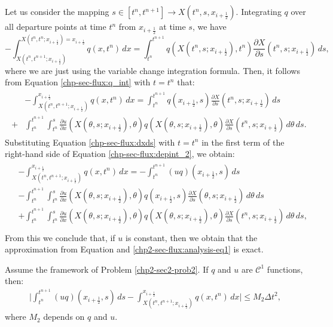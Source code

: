 Let us consider the mapping $s\in[t^n,t^{n+1}] \to X(t^n,s,x_{i+\frac{1}{2}})$. 
Integrating $q$ over all departure points at time $t^n$ from $x_{i+\frac{1}{2}}$ at time $s$, we have
\begin{equation}
	\label{chp-sec-flux:depint_1}
	-\int^{X(t^n,t^{n};x_{i+\frac{1}{2}}) = x_{i+\frac{1}{2}}}_{X(t^n,t^{n+1};x_{i+\frac{1}{2}})} q(x,t^n)\,dx 
		= \int_{t^n}^{t^{n+1}} q(X(t^n,s;x_{i+\frac{1}{2}}),t^n) \frac{\partial X}{\partial s} (t^n,s;x_{i+\frac{1}{2}})\,ds,
\end{equation}
where we are just using the variable change integration formula.
Then, it follows from Equation \eqref{chp-sec-flux:q_int} with $t=t^n$ that:
\begin{align}
	\label{chp-sec-flux:depint_2}
	\begin{split}
		&-\int_{X(t^n,t^{n+1};x_{i+\frac{1}{2}})}^{x_{i+\frac{1}{2}}} q(x,t^n)\,dx 
		= \int_{t^n}^{t^{n+1}} q(x_{i+\frac{1}{2}},s) \frac{\partial X}{\partial s} (t^n,s;x_{i+\frac{1}{2}}) \,ds \\ 
		+&\int_{t^n}^{t^{n+1}} \int_{t^n}^{s}
		\frac{\partial u}{\partial x}(X(\theta,s;x_{i+\frac{1}{2}}),\theta) q(X(\theta,s;x_{i+\frac{1}{2}}),\theta) 
		\frac{\partial X}{\partial s} (t^n,s;x_{i+\frac{1}{2}}) \,d\theta \,ds.
	\end{split}
\end{align}
Substituting Equation \eqref{chp-sec-flux:dxds} with $t=t^n$ in the first term of the right-hand side
of Equation \eqref{chp-sec-flux:depint_2}, we obtain:
\begin{align}
	\label{chp-sec-flux:depint_3}
	\begin{split}
		&-\int^{x_{i+\frac{1}{2}}}_{X(t^n,t^{n+1};x_{i+\frac{1}{2}})} q(x,t^n)\,dx 
		= -\int_{t^n}^{t^{n+1}} (uq)(x_{i+\frac{1}{2}},s) \,ds \\
		&-\int_{t^n}^{t^{n+1}} \int_{t^n}^{s} \frac{\partial u}{\partial x}(X(\theta,s;x_{i+\frac{1}{2}}),\theta)
		q(x_{i+\frac{1}{2}},s)
		\frac{\partial X}{\partial s} (\theta,s;x_{i+\frac{1}{2}})\,d\theta \,ds\\
		&+ \int_{t^n}^{t^{n+1}} \int_{t^n}^{s}
		\frac{\partial u}{\partial x}(X(\theta,s;x_{i+\frac{1}{2}}),\theta) q(X(\theta,s;x_{i+\frac{1}{2}}),\theta) 
		\frac{\partial X}{\partial s} (t^n,s;x_{i+\frac{1}{2}}) \,d\theta \,ds,\\
	\end{split}
\end{align}
From this we conclude that, if $u$ is constant, then we obtain that the approximation
from Equation and \eqref{chp2-sec-flux:analysis-eq1} is exact.
\begin{prop}
	\label{chp2-sec-flux:prop1}
Assume the framework of Problem \ref{chp2-sec2-prob2}.
If $q$ and $u$ are $\mathcal{C}^1$ functions, then:
\begin{align}
			\label{chp2-sec-flux:approx1}
			\bigg|
			\int_{t^n}^{t^{n+1}} (uq)(x_{i+\frac{1}{2}},s) \,ds -
			\int^{x_{i+\frac{1}{2}}}_{X(t^n,t^{n+1};x_{i+\frac{1}{2}})} q(x,t^n)\,dx 
			\bigg| \leq M_2 \Delta t ^2,
\end{align}
where $M_2$ depends on $q$ and $u$.
\end{prop}

